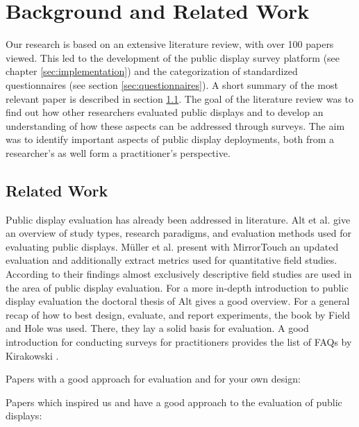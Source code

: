 \section{Background and Related Work} %
\label{chapter:background_related-work}

	Our research is based on an extensive literature review, with over 100 papers viewed. This led to the development of the public display survey platform (see chapter \ref{sec:implementation}) and the categorization of standardized questionnaires (see section \ref{sec:questionnaires}). A short summary of the most relevant paper is described in section \ref{sec:related-work}.
	The goal of the literature review was to find out how other researchers evaluated public displays and to develop an understanding of how these aspects can be addressed through surveys. The aim was to identify important aspects of public display deployments, both from a researcher's as well form a practitioner's perspective. 


\subsection{Related Work}
\label{sec:related-work}

	Public display evaluation has already been addressed in literature. Alt et al. \cite{Alt2012HowToEvaluate} give an overview of study types, research paradigms, and evaluation methods used for evaluating public displays. M{\"u}ller et al. present with MirrorTouch \cite{muller2014mirrortouch} an updated evaluation and additionally extract metrics used for quantitative field studies. According to their findings almost exclusively descriptive field studies are used in the area of public display evaluation. For a more in-depth introduction to public display evaluation the doctoral thesis of Alt \cite{alt2013thesis} gives a good overview.
	For a general recap of how to best design, evaluate, and report experiments, the book by Field and Hole \cite{field2003design} was used. There, they lay a solid basis for evaluation. A good introduction for conducting surveys for practitioners provides the list of FAQs by Kirakowski \cite{kirakowski2000questionnaireFAQ}. 


	Papers with a good approach for evaluation and for your own design:

	Papers which inspired us and have a good approach to the evaluation of public displays: 

